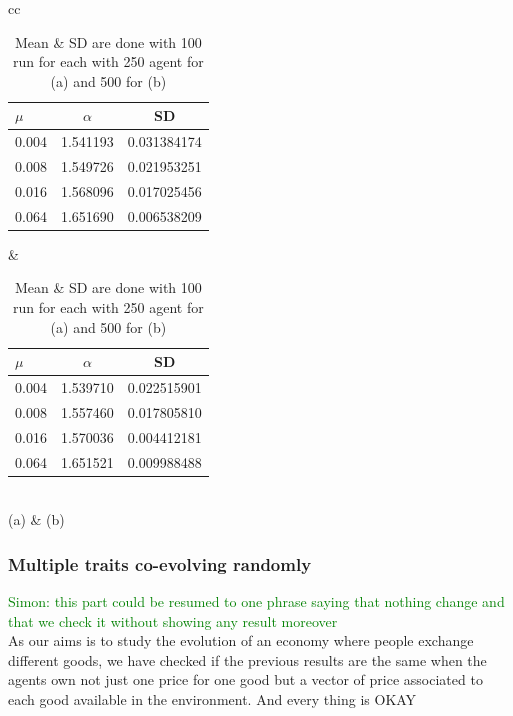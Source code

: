 \documentclass{wscpaperproc}
\newcommand{\memo}[2]{\textcolor{#1}{#2}}
\newcommand{\simon}[1]{\memo{green}{Simon: #1\\}}
\begin{document}
\begin{table}
	\centering
	\begin{tabular}{cc}
		\begin{tabular}{l|cc}
			$\mu$ & $\alpha$ & SD\\\hline
			0.004&1.541193&0.031384174\\
			0.008&1.549726&0.021953251\\
			0.016&1.568096&0.017025456\\
			0.064&1.651690&0.006538209\\

		\end{tabular}
		&
		\begin{tabular}{l|cc}
			$\mu$ & $\alpha$ & SD\\\hline
			0.004&1.539710&0.022515901\\
			0.008&1.557460&0.017805810\\
			0.016&1.570036&0.004412181\\
			0.064&1.651521&0.009988488\\
		\end{tabular}\\
		(a) & (b)
	\end{tabular}
	\caption{Mean \& SD are done with 100 run for each with 250 agent for (a) and 500 for (b) }
	\label{tab:mualpha}
\end{table}

\subsubsection{Multiple traits co-evolving randomly}
\simon{ this part could be resumed to one phrase saying that nothing change and that we check it without showing any result moreover}
As our aims is to study the evolution of an economy where people exchange different goods, we have checked if the previous results are the same when the agents own not just one price for one good but a vector of price associated to each good available in the environment. And every thing is OKAY


\end{document}
